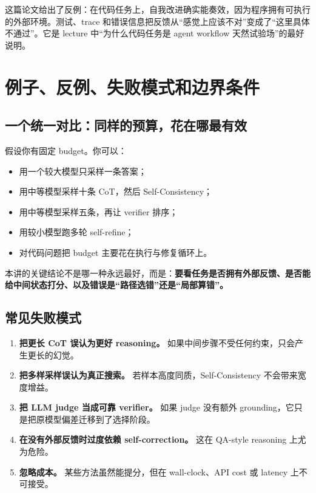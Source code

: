 \documentclass[a4paper]{article}
\begin{document}
这篇论文给出了反例：在代码任务上，自我改进确实能奏效，因为程序拥有可执行的外部环境。测试、trace 和错误信息把反馈从“感觉上应该不对”变成了“这里具体不通过”。它是 lecture 中“为什么代码任务是 agent workflow 天然试验场”的最好说明。

\section{例子、反例、失败模式和边界条件}

\subsection{一个统一对比：同样的预算，花在哪最有效}

假设你有固定 budget。你可以：
\begin{itemize}
\item 用一个较大模型只采样一条答案；
\item 用中等模型采样十条 CoT，然后 Self-Consistency；
\item 用中等模型采样五条，再让 verifier 排序；
\item 用较小模型跑多轮 self-refine；
\item 对代码问题把 budget 主要花在执行与修复循环上。
\end{itemize}

本讲的关键结论不是哪一种永远最好，而是：\textbf{要看任务是否拥有外部反馈、是否能给中间状态打分、以及错误是“路径选错”还是“局部算错”。}

\subsection{常见失败模式}

\begin{enumerate}
\item \textbf{把更长 CoT 误认为更好 reasoning。} 如果中间步骤不受任何约束，只会产生更长的幻觉。
\item \textbf{把多样采样误认为真正搜索。} 若样本高度同质，Self-Consistency 不会带来宽度增益。
\item \textbf{把 LLM judge 当成可靠 verifier。} 如果 judge 没有额外 grounding，它只是把原模型偏差迁移到了选择阶段。
\item \textbf{在没有外部反馈时过度依赖 self-correction。} 这在 QA-style reasoning 上尤为危险。
\item \textbf{忽略成本。} 某些方法虽然能提分，但在 wall-clock、API cost 或 latency 上不可接受。
\end{enumerate}
\end{document}
